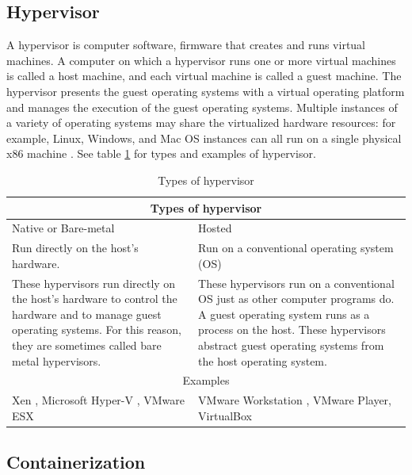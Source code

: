 \subsection{Hypervisor}

A hypervisor is computer software, firmware that creates and runs virtual machines. A computer on which a hypervisor runs one or more virtual machines is called a host machine, and each virtual machine is called a guest machine. The hypervisor presents the guest operating systems with a virtual operating platform and manages the execution of the guest operating systems. Multiple instances of a variety of operating systems may share the virtualized hardware resources: for example, Linux, Windows, and Mac OS instances can all run on a single physical x86 machine \cite{hypervisor}. See table \ref{table:hypervisor_types} for types and examples of hypervisor.

\begin{table}
    \begin{tabular}{ p{70mm} | p{70mm} }
        \hline
        \multicolumn{2}{c}{Types of hypervisor} \\
        \hline
        Native or Bare-metal & Hosted \\
        \hline
            Run directly on the host's hardware.& 
            Run on a conventional operating system (OS)\\
        \hline
            These hypervisors run directly on the host's hardware to control the hardware and to manage guest operating systems. For this reason, they are sometimes called bare metal hypervisors.& 
            These hypervisors run on a conventional OS just as other computer programs do. A guest operating system runs as a process on the host. These hypervisors abstract guest operating systems from the host operating system.   \\
        \hline
        \multicolumn{2}{c}{Examples} \\
        \hline
            Xen \cite{Xen}, Microsoft Hyper-V \cite{Hyper-V}, VMware ESX \cite{VMware_ESXi} & 
            VMware Workstation \cite{VMware_Workstation}, VMware Player, VirtualBox \cite{VirtualBox} \\
        \hline
    \end{tabular}
    \caption{Types of hypervisor}
    \label{table:hypervisor_types}
\end{table}

\subsection{Containerization}

